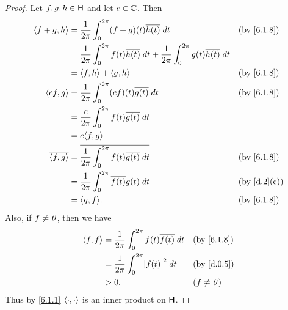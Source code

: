 \begin{proof}
  Let \(f, g, h \in \mathsf{H}\) and let \(c \in \mathbb{C}\).
  Then
  \begin{align*}
    \inn{f + g, h}    & = \frac{1}{2\pi} \int_0^{2\pi} (f + g)(t) \conj{h(t)} \; dt                                                 &  & \text{(by \cref{6.1.8})}  \\
                      & = \frac{1}{2\pi} \int_0^{2\pi} f(t) \conj{h(t)} \; dt + \frac{1}{2\pi} \int_0^{2\pi} g(t) \conj{h(t)} \; dt                                \\
                      & = \inn{f, h} + \inn{g, h}                                                                                   &  & \text{(by \cref{6.1.8})}  \\
    \inn{cf, g}       & = \frac{1}{2\pi} \int_0^{2\pi} (cf)(t) \conj{g(t)} \; dt                                                    &  & \text{(by \cref{6.1.8})}  \\
                      & = \frac{c}{2\pi} \int_0^{2\pi} f(t) \conj{g(t)} \; dt                                                                                      \\
                      & = c \inn{f, g}                                                                                                                             \\
    \conj{\inn{f, g}} & = \conj{\frac{1}{2\pi} \int_0^{2\pi} f(t) \conj{g(t)} \; dt}                                                &  & \text{(by \cref{6.1.8})}  \\
                      & = \frac{1}{2\pi} \int_0^{2\pi} \conj{f(t)} g(t) \; dt                                                       &  & \text{(by \cref{d.2}(c))} \\
                      & = \inn{g, f}.                                                                                               &  & \text{(by \cref{6.1.8})}
  \end{align*}
  Also, if \(f \neq \mathit{0}\), then we have
  \begin{align*}
    \inn{f, f} & = \frac{1}{2\pi} \int_0^{2\pi} f(t) \conj{f(t)} \; dt &  & \text{(by \cref{6.1.8})} \\
               & = \frac{1}{2\pi} \int_0^{2\pi} \abs{f(t)}^2 \; dt     &  & \text{(by \cref{d.0.5})} \\
               & > 0.                                                  &  & (f \neq \zv)
  \end{align*}
  Thus by \cref{6.1.1} \(\left\langle\cdot, \cdot\right\rangle\) is an inner product on \(\mathsf{H}\).
\end{proof}

